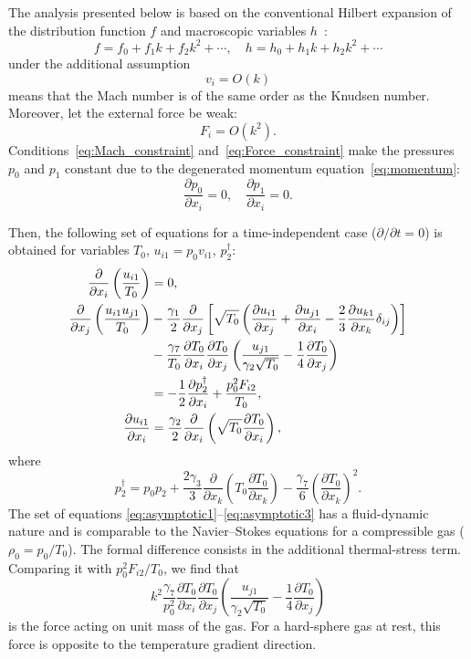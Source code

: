 \documentclass[smallextended, referee]{svjour3} %
\newcommand{\pder}[2][]{\frac{\partial#1}{\partial#2}}
\newcommand{\Pder}[2][]{\partial#1/\partial#2}
\begin{document}
The analysis presented below is based on the conventional Hilbert expansion
of the distribution function \(f\) and macroscopic variables \(h\)~\cite{Hilbert1912}:
\[ f = f_0 + f_1k + f_2k^2 + \cdots, \quad h = h_0 + h_1k + h_2k^2 + \cdots \]
under the additional assumption
\begin{equation}\label{eq:Mach_constraint}
    v_i = O(k)
\end{equation}
means that the Mach number is of the same order as the Knudsen number.
Moreover, let the external force be weak:
\begin{equation}\label{eq:Force_constraint}
    F_i = O(k^2).
\end{equation}
Conditions~\eqref{eq:Mach_constraint} and~\eqref{eq:Force_constraint} make the pressures
\(p_0\) and \(p_1\) constant due to the degenerated momentum equation~\eqref{eq:momentum}:
\begin{equation}
    \pder[p_0]{x_i} = 0, \quad \pder[p_1]{x_i} = 0.
\end{equation}

Then, the following set of equations for a time-independent case (\(\Pder{t} = 0\))
is obtained for variables \(T_0\), \(u_{i1} = p_0v_{i1}\), \(p_2^\dag\):
\begin{align}
    \pder{x_i}\left(\frac{u_{i1}}{T_0}\right) &= 0, \label{eq:asymptotic1} \\
    \pder{x_j}\left(\frac{u_{i1}u_{j1}}{T_0}\right)
        &-\frac{\gamma_1}2\pder{x_j}\left[\sqrt{T_0}\left(
            \pder[u_{i1}]{x_j} + \pder[u_{j1}]{x_i} - \frac23\pder[u_{k1}]{x_k}\delta_{ij}
        \right)\right] \notag\\
        &- \frac{\gamma_7}{T_0}\pder[T_0]{x_i}\pder[T_0]{x_j}\left(\frac{u_{j1}}{\gamma_2\sqrt{T_0}} - \frac{1}4\pder[T_0]{x_j}\right) \notag\\
        &= -\frac12\pder[p_2^\dag]{x_i} + \frac{p_0^2 F_{i2}}{T_0}, \label{eq:asymptotic2} \\
    \pder[u_{i1}]{x_i} &= \frac{\gamma_2}2\pder{x_i}\left(\sqrt{T_0}\pder[T_0]{x_i}\right), \label{eq:asymptotic3}
\end{align}
where
\begin{equation}\label{eq:dag_pressure}
    p_2^\dag = p_0 p_2
        + \frac{2\gamma_3}{3}\pder{x_k}\left(T_0\pder[T_0]{x_k}\right)
        - \frac{\gamma_7}{6}\left(\pder[T_0]{x_k}\right)^2.
\end{equation}
The set of equations \eqref{eq:asymptotic1}--\eqref{eq:asymptotic3} has a fluid-dynamic nature
and is comparable to the Navier--Stokes equations for a compressible gas (\(\rho_0 = p_0/T_0\)).
The formal difference consists in the additional thermal-stress term.
Comparing it with \(p_0^2F_{i2}/T_0\), we find that
\begin{equation}\label{eq:force}
    k^2\frac{\gamma_7}{p_0^2}\pder[T_0]{x_i}\pder[T_0]{x_j}\left(\frac{u_{j1}}{\gamma_2\sqrt{T_0}} - \frac{1}4\pder[T_0]{x_j}\right)
\end{equation}
is the force acting on unit mass of the gas.
For a hard-sphere gas at rest, this force is opposite to the temperature gradient direction.
\end{document}
